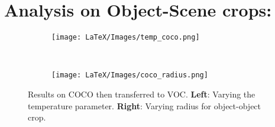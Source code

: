 
\section{Analysis on Object-Scene crops:}
\label{sec:analysis_object_oobject}

\begin{figure*}[t!]

  \centering
  \begin{subfigure}[t]{0.48\textwidth}
   \centering
    \texttt{[image: LaTeX/Images/temp\_coco.png]}
   
     \label{tab:voc_analysis_tau}
  \end{subfigure} 
  ~
  \begin{subfigure}[t]{0.48\linewidth}
   \centering
    \texttt{[image: LaTeX/Images/coco\_radius.png]}
  \end{subfigure}
    

\caption{Results on COCO then transferred to VOC. \textbf{Left}: Varying the temperature parameter.  \textbf{Right}: Varying radius for object-object crop.}
\label{fig:voc_analysis_temp_radius}
\end{figure*}



